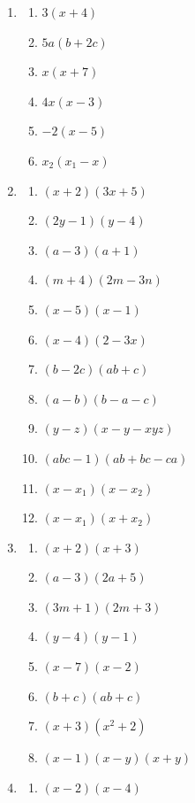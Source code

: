 \documentclass[11pt,a4paper]{scrartcl}
\begin{document}
\begin{enumerate}[label=\textbf{\arabic*.}, leftmargin=*]
    \item
    \begin{enumerate}[label={(\arabic*)}]
        \item $3(x+4)$
        \item $5a(b+2c)$
        \item $x(x+7)$
        \item $4x(x-3)$
        \item $-2(x-5)$
        \item $x_2(x_1-x)$
    \end{enumerate}
    \item
    \begin{enumerate}[label={(\arabic*)}]
        \item $(x+2)(3x+5)$
        \item $(2y-1)(y-4)$
        \item $(a-3)(a+1)$
        \item $(m+4)(2m-3n)$
        \item $(x-5)(x-1)$
        \item $(x-4)(2-3x)$
        \item $(b-2c)(ab+c)$
        \item $(a-b)(b-a-c)$
        \item $(y-z)(x-y-xyz)$
        \item $(abc-1)(ab+bc-ca)$
        \item $(x-x_1)(x-x_2)$
        \item $(x-x_1)(x+x_2)$
    \end{enumerate}
    \item
    \begin{enumerate}[label={(\arabic*)}]
        \item $(x+2)(x+3)$
        \item $(a-3)(2a+5)$
        \item $(3m+1)(2m+3)$
        \item $(y-4)(y-1)$
        \item $(x-7)(x-2)$
        \item $(b+c)(ab+c)$
        \item $(x+3)(x^2+2)$
        \item $(x-1)(x-y)(x+y)$
    \end{enumerate}
    \setcounter{enumi}{4}
    \item
    \begin{enumerate}[label={(\arabic*)}]
        \item $(x-2)(x-4)$

\end{enumerate}
\end{enumerate}
\end{document}

